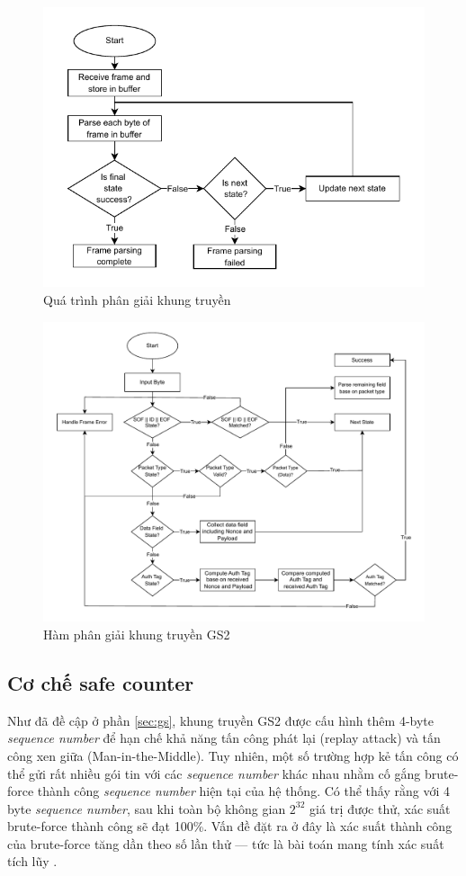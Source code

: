 \begin{figure}[h]
    \centering
    \includegraphics[width=0.7\linewidth]{frameparsing1.pdf}
    \caption{Quá trình phân giải khung truyền}
    \label{fig:parse-function}
\end{figure}

\begin{figure}[H]
    \raggedright
    \hspace{-1.7cm}
    \includegraphics[width=1.1\linewidth]{frameparse.pdf}
    \caption{Hàm phân giải khung truyền GS2}
    \label{fig:parsing}
\end{figure}

\subsection{Cơ chế safe counter}
\label{sec:safe_counter}
Như đã đề cập ở phần \ref{sec:gs}, khung truyền GS2 được cấu hình thêm 4-byte \textit{sequence number} để hạn chế khả năng tấn công phát lại (replay attack) và tấn công xen giữa (Man-in-the-Middle). Tuy nhiên, một số trường hợp kẻ tấn công có thể gửi rất nhiều gói tin với các \textit{sequence number} khác nhau nhằm cố gắng brute-force thành công \textit{sequence number} hiện tại của hệ thống. Có thể thấy rằng với 4 byte \textit{sequence number}, sau khi toàn bộ không gian $2^{32}$ giá trị được thử, xác suất brute-force thành công sẽ đạt 100\%. Vấn đề đặt ra ở đây là xác suất thành công của brute-force tăng dần theo số lần thử — tức là bài toán mang tính xác suất tích lũy \cite{cumulative}. 

